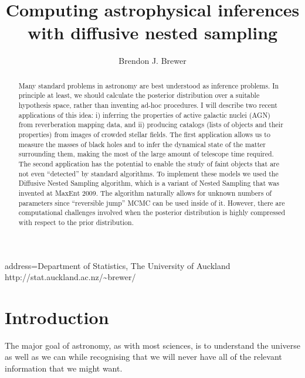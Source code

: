 \documentclass[
  ,final            %
  ]
  {aipproc}
\begin{document}
\title{Computing astrophysical inferences with diffusive nested sampling}


\author{Brendon J. Brewer}{
  address={Department of Statistics, The University of Auckland\\
http://stat.auckland.ac.nz/\~{ }brewer/}
}


\begin{abstract}
Many standard problems in astronomy are best understood as inference problems.
In principle at least,
we should calculate the posterior distribution over a suitable hypothesis space,
rather than inventing ad-hoc procedures. I will describe two recent applications
of this idea: i) inferring the properties of active galactic nuclei (AGN)
from reverberation mapping data, and ii) producing catalogs (lists of objects
and their properties) from images of
crowded stellar fields. The first application allows us to measure the masses
of black holes and to infer the dynamical state of the matter surrounding them,
making the most of the large amount of telescope time required. The second
application has the potential to enable the study of faint objects that are not
even ``detected'' by standard algorithms.
To implement these models we used the Diffusive Nested Sampling algorithm,
which is a variant of Nested Sampling that was invented at MaxEnt 2009. The
algorithm naturally allows for unknown numbers of parameters since
``reversible jump'' MCMC can be used inside of it. However, there are
computational challenges involved when the posterior distribution is highly
compressed with respect to the prior distribution.
\end{abstract}

\maketitle


\section{Introduction}
The major goal of astronomy, as with most sciences, is to understand the
universe as well as we can while recognising that we will never have all of
the relevant information that we might want. 
\end{document}
